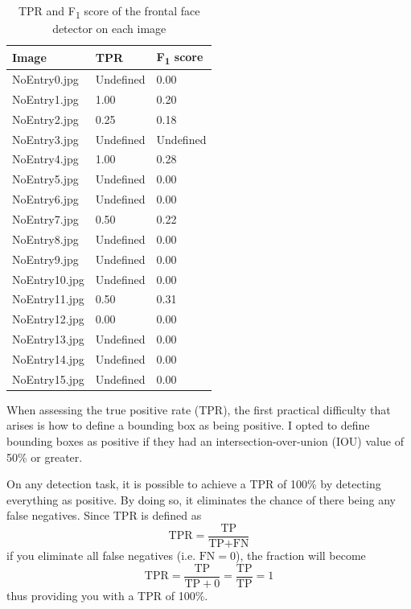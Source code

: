 \documentclass[onecolumn, 11pt, a4paper]{article}
\begin{document}
\begin{table}
  \vspace{-2.5em}
  \begin{center}
  \caption{TPR and F\textsubscript{1} score of the frontal face detector on each image}\label{tab:face}
  \begin{tabular}{l l l} 
    \hline\hline
    Image & TPR & F\textsubscript{1} score\\
    \hline
    NoEntry0.jpg & Undefined & 0.00 \\ 
    NoEntry1.jpg & 1.00 & 0.20 \\ 
    NoEntry2.jpg & 0.25 & 0.18 \\ 
    NoEntry3.jpg & Undefined & Undefined \\ 
    NoEntry4.jpg & 1.00 & 0.28 \\ 
    NoEntry5.jpg & Undefined & 0.00 \\ 
    NoEntry6.jpg & Undefined & 0.00 \\ 
    NoEntry7.jpg & 0.50 & 0.22 \\ 
    NoEntry8.jpg & Undefined & 0.00 \\ 
    NoEntry9.jpg & Undefined & 0.00 \\ 
    NoEntry10.jpg & Undefined & 0.00 \\ 
    NoEntry11.jpg & 0.50 & 0.31 \\ 
    NoEntry12.jpg & 0.00 & 0.00 \\ 
    NoEntry13.jpg & Undefined & 0.00 \\ 
    NoEntry14.jpg & Undefined & 0.00 \\ 
    NoEntry15.jpg & Undefined & 0.00 \\ 
    \hline
  \end{tabular}
  \end{center}
\end{table} 

When assessing the true positive rate (TPR), the first practical difficulty that arises is how to define a bounding box as being positive.
I opted to define bounding boxes as positive if they had an intersection-over-union (IOU) value of 50\% or greater.

On any detection task, it is possible to achieve a TPR of 100\% by detecting everything as positive.
By doing so, it eliminates the chance of there being any false negatives. 
Since TPR is defined as \[\text{TPR} = \frac{\text{TP}}{\text{TP} + \text{FN}}\]
if you eliminate all false negatives (i.e. $\text{FN} = 0$), the fraction will become
\[\text{TPR} = \frac{\text{TP}}{\text{TP} + 0} = \frac{\text{TP}}{\text{TP}} = 1\]
thus providing you with a TPR of 100\%.
\end{document}
